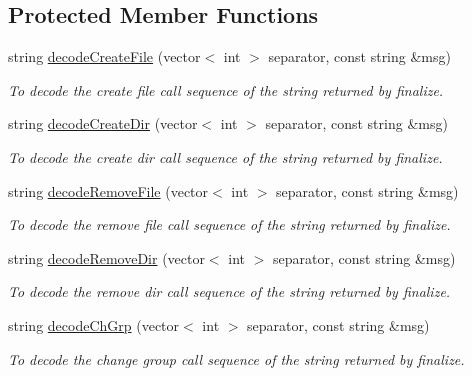 \subsection*{Protected Member Functions}
\begin{DoxyCompactItemize}
\item 
string \hyperlink{classFMSMapper_a7d60c846f11939b1b854fccd13db9fd3}{decodeCreateFile} (vector$<$ int $>$ separator, const string \&msg)
\begin{DoxyCompactList}\small\item\em To decode the create file call sequence of the string returned by finalize. \item\end{DoxyCompactList}\item 
string \hyperlink{classFMSMapper_a3442dcd927849df4d099afbadcb47282}{decodeCreateDir} (vector$<$ int $>$ separator, const string \&msg)
\begin{DoxyCompactList}\small\item\em To decode the create dir call sequence of the string returned by finalize. \item\end{DoxyCompactList}\item 
string \hyperlink{classFMSMapper_a24494776db6907366c1b015b310af65e}{decodeRemoveFile} (vector$<$ int $>$ separator, const string \&msg)
\begin{DoxyCompactList}\small\item\em To decode the remove file call sequence of the string returned by finalize. \item\end{DoxyCompactList}\item 
string \hyperlink{classFMSMapper_aa7f449eb2849623fa07d11546babccc9}{decodeRemoveDir} (vector$<$ int $>$ separator, const string \&msg)
\begin{DoxyCompactList}\small\item\em To decode the remove dir call sequence of the string returned by finalize. \item\end{DoxyCompactList}\item 
string \hyperlink{classFMSMapper_afb90bbc4b6475fcaafdad37b2c2875ae}{decodeChGrp} (vector$<$ int $>$ separator, const string \&msg)
\begin{DoxyCompactList}\small\item\em To decode the change group call sequence of the string returned by finalize. \item\end{DoxyCompactList}\item 

\end{DoxyCompactItemize}

